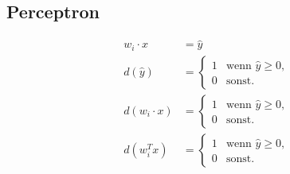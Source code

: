 \subsection{Perceptron}
\begin{flushleft}

                        
\begin{align*}
w_{i}\cdot x &= \hat{y} \\
d(\hat{y}) &= \begin{cases}
       		1 & \text{wenn } \hat{y} \geq 0, \\
       		0 & \text{sonst.}
    	\end{cases} \\
d(w_{i} \cdot x) &= \begin{cases}
       		1 & \text{wenn } \hat{y} \geq 0, \\
       		0 & \text{sonst.}
    	\end{cases} \\
d(w_{i}^{T}x) &= \begin{cases}
       		1 & \text{wenn } \hat{y} \geq 0, \\
       		0 & \text{sonst.}
    	\end{cases} \\
\end{align*}
                        
                        
\newcommand{\myThresholdFunction}{
\draw[thick] (-2.25em,0em) -- (1.25em,0em) 
			 (-0.5em,1.75em) -- (-0.5em,-1.75em)
(-0.5em,1.25em) -- (0.5em,1.25em)
(-0.5em,-1.25em) -- (-1.5em,-1.25em)
;}
                        
\end{flushleft}
